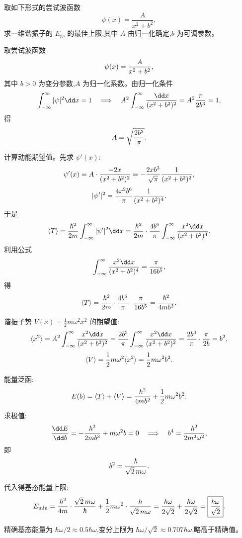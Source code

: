 \begin{question}
取如下形式的尝试波函数
\[
\psi(x)=\frac{A}{x^2+b^2},
\]
求一维谐振子的 $E_{\mathrm{gs}}$ 的最佳上限,其中 $A$ 由归一化确定,$b$ 为可调参数。
\end{question}
\begin{solution}
取尝试波函数
\[
\psi(x)={A\over x^2+b^2},
\]
其中 $b>0$ 为变分参数,$A$ 为归一化系数。由归一化条件
\[
\int_{-\infty}^{\infty}|\psi|^2\dd x=1
\quad\Longrightarrow\quad
A^2\int_{-\infty}^{\infty}{\dd x\over(x^2+b^2)^2}=A^2{\pi\over2b^3}=1,
\]
得
\[
A=\sqrt{2b^3\over\pi}.
\]

计算动能期望值。先求 $\psi'(x)$:
\[
\psi'(x)=A\cdot{-2x\over(x^2+b^2)^2}
=-{2xb^3\over\sqrt{\pi}}{1\over(x^2+b^2)^2},
\]
\[
|\psi'|^2={4x^2b^6\over\pi}{1\over(x^2+b^2)^4}.
\]
于是
\[
\langle T\rangle={\hbar^2\over2m}\int_{-\infty}^{\infty}|\psi'|^2\dd x
={\hbar^2\over2m}\cdot{4b^6\over\pi}\int_{-\infty}^{\infty}{x^2\dd x\over(x^2+b^2)^4}.
\]
利用公式
\[
\int_{-\infty}^{\infty}{x^2\dd x\over(x^2+b^2)^4}={\pi\over16b^5},
\]
得
\[
\langle T\rangle={\hbar^2\over2m}\cdot{4b^6\over\pi}\cdot{\pi\over16b^5}
={\hbar^2\over4mb^2}.
\]

谐振子势 $V(x)=\frac12m\omega^2x^2$ 的期望值:
\[
\langle x^2\rangle = A^2\int_{-\infty}^{\infty}{x^2\dd x\over(x^2+b^2)^2}
={2b^3\over\pi}\int_{-\infty}^{\infty}{x^2\dd x\over(x^2+b^2)^2}
={2b^3\over\pi}\cdot{\pi\over2b}=b^2,
\]
\[
\langle V\rangle={1\over2}m\omega^2\langle x^2\rangle={1\over2}m\omega^2b^2.
\]

能量泛函:
\[
E(b)=\langle T\rangle+\langle V\rangle
={\hbar^2\over4mb^2}+{1\over2}m\omega^2b^2.
\]

求极值:
\[
{\dd E\over\dd b}=-{\hbar^2\over2mb^3}+m\omega^2b=0
\quad\Longrightarrow\quad
b^4={\hbar^2\over2m^2\omega^2},
\]
即
\[
b^2={\hbar\over\sqrt2\,m\omega}.
\]

代入得基态能量上限:
\[
E_{\min}={\hbar^2\over4m}\cdot{\sqrt2\,m\omega\over\hbar}
+{1\over2}m\omega^2\cdot{\hbar\over\sqrt2\,m\omega}
={\hbar\omega\over2\sqrt2}+{\hbar\omega\over2\sqrt2}
=\boxed{{\hbar\omega\over\sqrt2}}.
\]

精确基态能量为 $\hbar\omega/2\approx0.5\hbar\omega$,变分上限为 $\hbar\omega/\sqrt2\approx0.707\hbar\omega$,略高于精确值。
\end{solution}

